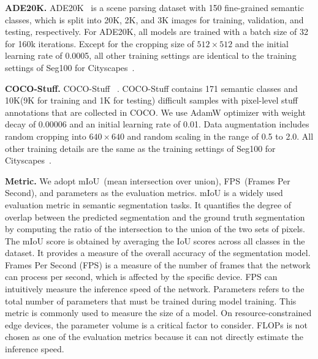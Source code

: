 \documentclass[letterpaper]{article} %
\begin{document}
\noindent
{\bf ADE20K.} ADE20K~\cite{zhou2017scene} is a scene parsing dataset with 150 fine-grained semantic classes, which is split into 20K, 2K, and 3K images for training, validation, and testing, respectively. For ADE20K, all models are trained with a batch size of 32 for 160k iterations. Except for the cropping size of $512 \times 512$ and the initial learning rate of 0.0005, all other training settings are identical to the training settings of Seg100 for Cityscapes~\cite{cordts2016cityscapes}.

\noindent
{\bf COCO-Stuff.} COCO-Stuff~\cite{caesar2018coco} . COCO-Stuff contains 171 semantic classes and 10K(9K for training and 1K for testing) difficult samples with pixel-level stuff annotations that are collected in COCO. We use AdamW optimizer with weight decay of 0.00006 and an initial learning rate of 0.01. Data augmentation includes random cropping into $640 \times 640$ and random scaling in the range of 0.5 to 2.0. All other training details are the same as the training settings of Seg100 for Cityscapes~\cite{cordts2016cityscapes}.

\noindent
{\bf Metric.} We adopt mIoU~(mean intersection over union), FPS~(Frames Per Second),  and parameters as the evaluation metrics. mIoU is a widely used evaluation metric in semantic segmentation tasks. It quantifies the degree of overlap between the predicted segmentation and the ground truth segmentation by computing the ratio of the intersection to the union of the two sets of pixels. The mIoU score is obtained by averaging the IoU scores across all classes in the dataset. It provides a measure of the overall accuracy of the segmentation model. Frames Per Second (FPS) is a measure of the number of frames that the network can process per second, which is affected by the specific device. FPS can intuitively measure the inference speed of the network. Parameters refers to the total number of parameters that must be trained during model training. This metric is commonly used to measure the size of a model. On resource-constrained edge devices, the parameter volume is a critical factor to consider. FLOPs is not chosen as one of the evaluation metrics because it can not directly estimate the inference speed.
\end{document}
